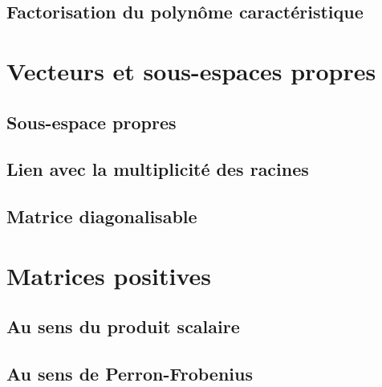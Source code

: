 \documentclass[french, 12pt]{report}
\numberwithin{exercise}{section}
\numberwithin{equation}{section}
\begin{document}
\subsection{Factorisation du polynôme caractéristique}

\section{Vecteurs et sous-espaces propres}

\subsection{Sous-espace propres}

\subsection{Lien avec la multiplicité des racines}

\subsection{Matrice diagonalisable}

\section{Matrices positives}

\subsection{Au sens du produit scalaire}

\subsection{Au sens de Perron-Frobenius}
\end{document}
